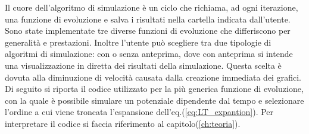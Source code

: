 \documentclass[12pt]{report}
\begin{document}
Il cuore dell'algoritmo di simulazione è un ciclo che richiama, ad ogni iterazione, una funzione di evoluzione e salva i risultati nella cartella indicata dall'utente.
Sono state implementate tre diverse funzioni di evoluzione che differiscono per generalità e prestazioni. Inoltre l'utente può scegliere tra due tipologie di algoritmi di simulazione: con o senza anteprima, dove con anteprima si intende una visualizzazione in diretta dei risultati della simulazione. Questa scelta è dovuta alla diminuzione di velocità causata dalla creazione immediata dei grafici.
Di seguito si riporta il codice utilizzato per la più generica funzione di evoluzione, con la quale è possibile simulare un potenziale dipendente dal tempo e selezionare l'ordine a cui viene troncata l'espansione dell'eq.(\ref{eq:LT_expantion}). Per interpretare il codice si faccia riferimento al capitolo(\ref{ch:teoria}).
\newpage
\end{document}
